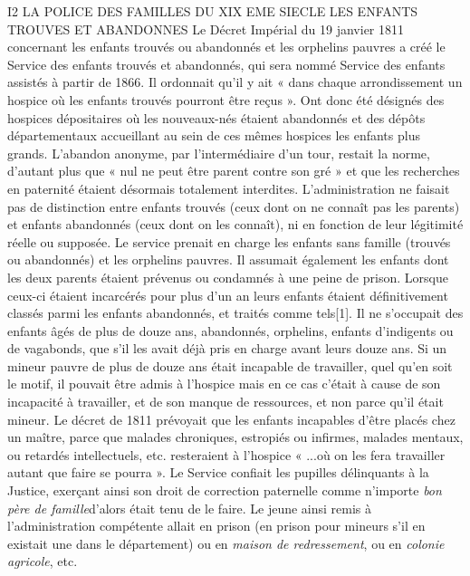 I2 LA POLICE DES FAMILLES DU XIX EME SIECLE
LES ENFANTS TROUVES ET ABANDONNES 
 Le Décret Impérial du 19 janvier 1811 concernant les enfants trouvés ou abandonnés et les orphelins pauvres a créé le Service des enfants trouvés et abandonnés, qui sera nommé Service des enfants assistés à partir de 1866. Il ordonnait qu'il y ait « dans chaque arrondissement un hospice où les enfants trouvés pourront être reçus ». Ont donc été désignés des hospices dépositaires où les nouveaux-nés étaient abandonnés et des dépôts départementaux accueillant au sein de ces mêmes hospices les enfants plus grands. 
 L'abandon anonyme, par l'intermédiaire d'un tour, restait la norme, d'autant plus que « nul ne peut être parent contre son gré » et que les recherches en paternité étaient désormais totalement interdites. L'administration ne faisait pas de distinction entre enfants trouvés (ceux dont on ne connaît pas les parents) et enfants abandonnés (ceux dont on les connaît), ni en fonction de leur légitimité réelle ou supposée.
 Le service prenait en charge les enfants sans famille (trouvés ou abandonnés) et les orphelins pauvres. Il assumait également les enfants dont les deux parents étaient prévenus ou condamnés à une peine de prison. Lorsque ceux-ci étaient incarcérés pour plus d'un an leurs enfants étaient définitivement classés parmi les enfants abandonnés, et traités comme tels[1]. Il ne s'occupait des enfants âgés de plus de douze ans, abandonnés, orphelins, enfants d'indigents ou de vagabonds, que s'il les avait déjà pris en charge avant leurs douze ans. Si un mineur pauvre de plus de douze ans était incapable de travailler, quel qu'en soit le motif, il pouvait être admis à l'hospice mais en ce cas c'était à cause de son incapacité à travailler, et de son manque de ressources, et non parce qu'il était mineur. Le décret de 1811 prévoyait que les enfants incapables d'être placés chez un maître, parce que malades chroniques, estropiés ou infirmes, malades mentaux, ou retardés intellectuels, etc. resteraient à l'hospice « ...où on les fera travailler autant que faire se pourra ». 
 Le Service confiait les pupilles délinquants à la Justice, exerçant ainsi son droit de correction paternelle comme n'importe\emph{ bon père de famille}d'alors était tenu de le faire. Le jeune ainsi remis à l'administration compétente allait en prison (en prison pour mineurs s'il en existait une dans le département) ou en \emph{maison de redressement}, ou en \emph{colonie agricole}, etc. 
